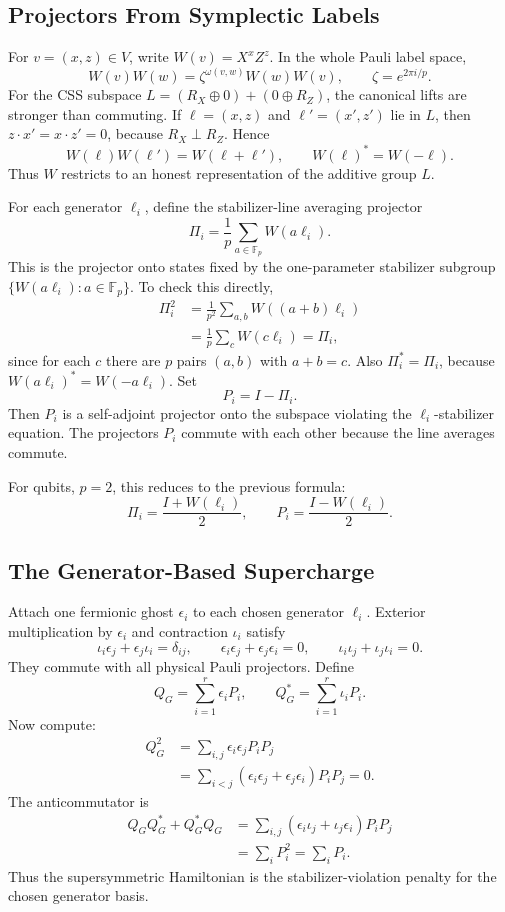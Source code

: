 \subsection{Projectors From Symplectic Labels}

For \(v=(x,z)\in V\), write \(W(v)=X^xZ^z\). In the whole Pauli label space,
\[
  W(v)W(w)=\zeta^{\omega(v,w)}W(w)W(v),
  \qquad \zeta=e^{2\pi i/p}.
\]
For the CSS subspace \(L=(R_X\oplus0)+(0\oplus R_Z)\), the canonical lifts are
stronger than commuting. If \(\ell=(x,z)\) and \(\ell'=(x',z')\) lie in \(L\),
then \(z\cdot x'=x\cdot z'=0\), because \(R_X\perp R_Z\). Hence
\[
  W(\ell)W(\ell')=W(\ell+\ell'),\qquad W(\ell)^*=W(-\ell).
\]
Thus \(W\) restricts to an honest representation of the additive group \(L\).

For each generator \(\ell_i\), define the stabilizer-line averaging projector
\[
  \Pi_i=\frac1p\sum_{a\in\mathbb F_p}W(a\ell_i).
\]
This is the projector onto states fixed by the one-parameter stabilizer
subgroup \(\{W(a\ell_i):a\in\mathbb F_p\}\). To check this directly,
\[
\begin{aligned}
  \Pi_i^2
  &=\frac1{p^2}\sum_{a,b}W((a+b)\ell_i)     \\
  &=\frac1p\sum_c W(c\ell_i)=\Pi_i,
\end{aligned}
\]
since for each \(c\) there are \(p\) pairs \((a,b)\) with \(a+b=c\). Also
\(\Pi_i^*=\Pi_i\), because \(W(a\ell_i)^*=W(-a\ell_i)\). Set
\[
  P_i=I-\Pi_i .
\]
Then \(P_i\) is a self-adjoint projector onto the subspace violating the
\(\ell_i\)-stabilizer equation. The projectors \(P_i\) commute with each other
because the line averages commute.

For qubits, \(p=2\), this reduces to the previous formula:
\[
  \Pi_i=\frac{I+W(\ell_i)}2,\qquad
  P_i=\frac{I-W(\ell_i)}2.
\]

\subsection{The Generator-Based Supercharge}

Attach one fermionic ghost \(\epsilon_i\) to each chosen generator
\(\ell_i\). Exterior multiplication by \(\epsilon_i\) and contraction
\(\iota_i\) satisfy
\[
  \iota_i\epsilon_j+\epsilon_j\iota_i=\delta_{ij},\qquad
  \epsilon_i\epsilon_j+\epsilon_j\epsilon_i=0,\qquad
  \iota_i\iota_j+\iota_j\iota_i=0.
\]
They commute with all physical Pauli projectors. Define
\[
  Q_G=\sum_{i=1}^r \epsilon_iP_i,\qquad
  Q_G^*=\sum_{i=1}^r \iota_iP_i .
\]
Now compute:
\[
\begin{aligned}
  Q_G^2
  &=\sum_{i,j}\epsilon_i\epsilon_jP_iP_j        \\
  &=\sum_{i<j}(\epsilon_i\epsilon_j+\epsilon_j\epsilon_i)P_iP_j=0.
\end{aligned}
\]
The anticommutator is
\[
\begin{aligned}
  Q_GQ_G^*+Q_G^*Q_G
  &=\sum_{i,j}(\epsilon_i\iota_j+\iota_j\epsilon_i)P_iP_j \\
  &=\sum_iP_i^2=\sum_iP_i .
\end{aligned}
\]
Thus the supersymmetric Hamiltonian is the stabilizer-violation penalty for
the chosen generator basis.

